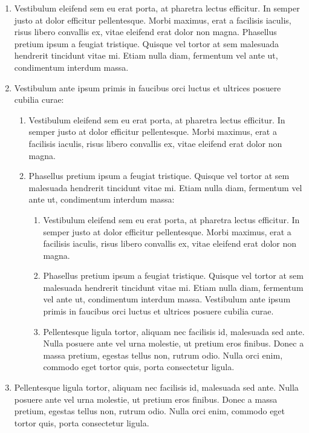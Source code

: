 \begin{enumerate}
		
	\item Vestibulum eleifend sem eu erat porta, at pharetra lectus efficitur. In semper justo at dolor efficitur pellentesque. Morbi maximus, erat a facilisis iaculis, risus libero convallis ex, vitae eleifend erat dolor non magna. Phasellus pretium ipsum a feugiat tristique. Quisque vel tortor at sem malesuada hendrerit tincidunt vitae mi. Etiam nulla diam, fermentum vel ante ut, condimentum interdum massa.
	\item  Vestibulum ante ipsum primis in faucibus orci luctus et ultrices posuere cubilia curae:
		\begin{enumerate}
			\item Vestibulum eleifend sem eu erat porta, at pharetra lectus efficitur. In semper justo at dolor efficitur pellentesque. Morbi maximus, erat a facilisis iaculis, risus libero convallis ex, vitae eleifend erat dolor non magna. 
			\item Phasellus pretium ipsum a feugiat tristique. Quisque vel tortor at sem malesuada hendrerit tincidunt vitae mi. Etiam nulla diam, fermentum vel ante ut, condimentum interdum massa:				
				\begin{enumerate}
					\item Vestibulum eleifend sem eu erat porta, at pharetra lectus efficitur. In semper justo at dolor efficitur pellentesque. Morbi maximus, erat a facilisis iaculis, risus libero convallis ex, vitae eleifend erat dolor non magna. 
					\item Phasellus pretium ipsum a feugiat tristique. Quisque vel tortor at sem malesuada hendrerit tincidunt vitae mi. Etiam nulla diam, fermentum vel ante ut, condimentum interdum massa. Vestibulum ante ipsum primis in faucibus orci luctus et ultrices posuere cubilia curae.
					\item Pellentesque ligula tortor, aliquam nec facilisis id, malesuada sed ante. Nulla posuere ante vel urna molestie, ut pretium eros finibus. Donec a massa pretium, egestas tellus non, rutrum odio. Nulla orci enim, commodo eget tortor quis, porta consectetur ligula.
				\end{enumerate}
				
		\end{enumerate}
	\item Pellentesque ligula tortor, aliquam nec facilisis id, malesuada sed ante. Nulla posuere ante vel urna molestie, ut pretium eros finibus. Donec a massa pretium, egestas tellus non, rutrum odio. Nulla orci enim, commodo eget tortor quis, porta consectetur ligula.

\end{enumerate}


